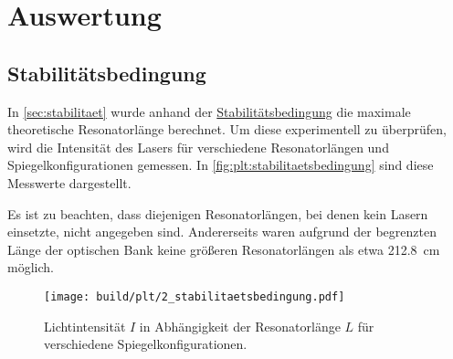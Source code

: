 \section{Auswertung}
\label{sec:auswertung}

\subsection{Stabilitätsbedingung}
\label{sec:auswertung:stabilitaetsbedingung}

In \autoref{sec:stabilitaet} wurde anhand der \hyperref[eqn:stabilitaetsbedingung]{Stabilitätsbedingung} die maximale theoretische Resonatorlänge berechnet.
Um diese experimentell zu überprüfen,
wird die Intensität des Lasers für verschiedene Resonatorlängen und Spiegelkonfigurationen gemessen.
In \autoref{fig:plt:stabilitaetsbedingung} sind diese Messwerte dargestellt.

Es ist zu beachten, dass diejenigen Resonatorlängen, bei denen kein Lasern einsetzte, nicht angegeben sind.
Andererseits waren aufgrund der begrenzten Länge der optischen Bank keine größeren Resonatorlängen als etwa \SI{212.8}{\centi\meter} möglich.

\begin{figure}
  \centering
   \texttt{[image: build/plt/2\_stabilitaetsbedingung.pdf]}
   \caption{Lichtintensität $I$ in Abhängigkeit der Resonatorlänge $L$ für verschiedene Spiegelkonfigurationen.}
   \label{fig:plt:stabilitaetsbedingung}
\end{figure}




